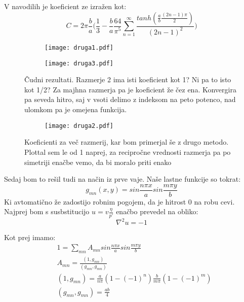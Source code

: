 \documentclass{article}
\begin{document}
V navodilih je koeficient ze izražen kot:
\begin{equation*}
C = 2\pi \frac{b}{a}\Big( \frac{1}{3} - \frac{b}{a} \frac{64}{\pi^5} \sum_{n=1}^{\infty} \frac{tanh(\frac{a}{b} \frac{(2n-1)\pi}{2})}{(2n-1)^2}\Big)
\end{equation*}

\begin{figure}[H]
\begin{subfigure}{.5\textwidth}
\texttt{[image: druga1.pdf]}
\end{subfigure}
\begin{subfigure}{.5\textwidth}
\texttt{[image: druga3.pdf]}
\end{subfigure}
\caption*{Čudni rezultati. Razmerje 2 ima isti koeficient kot 1? Ni pa to isto kot 1/2? Za majhna razmerja pa je koeficient že čez ena. Konvergira pa seveda hitro, saj v vsoti delimo z indeksom na peto potenco, nad ulomkom pa je omejena funkcija.} 
\end{figure}

\begin{figure}[H]
\begin{subfigure}{.5\textwidth}
\texttt{[image: druga2.pdf]}
\end{subfigure}
\caption*{Koeficienti za več razmerij, kar bom primerjal še z drugo metodo. Plottal sem le od 1 naprej, za recipročne vrednosti razmerja pa po simetriji enačbe vemo, da bi moralo priti enako}
\end{figure}




Sedaj bom to rešil tudi na način iz prve vaje. Naše lastne funkcije so tokrat:
\begin{equation*}
g_{mn}(x,y) = sin \frac{n\pi x}{a} sin \frac{m \pi y}{b}
\end{equation*}
Ki avtomatično že zadostijo robnim pogojem, da je hitrost 0 na robu cevi.
Najprej bom s susbstitucijo $u = v \frac{\eta}{p'}$ enačbo prevedel na obliko:
\begin{equation*}
\nabla^2 u = -1
\end{equation*}

Kot prej imamo:
\begin{align*}
&1 = \sum_{mn} A_{mn} sin \frac{n\pi x}{a} sin \frac{m \pi y}{b} \\
&A_{mn} = \frac{(1,g_{mn})}{(g_{mn},g_{mn})}  \\
& (1,g_{mn}) = \frac{a}{n \pi} (1- (-1)^n) \frac{b}{m \pi} (1- (-1)^m) \\
& (g_{mn},g_{mn}) = \frac{ab}{4} 
\end{align*}
\end{document}

